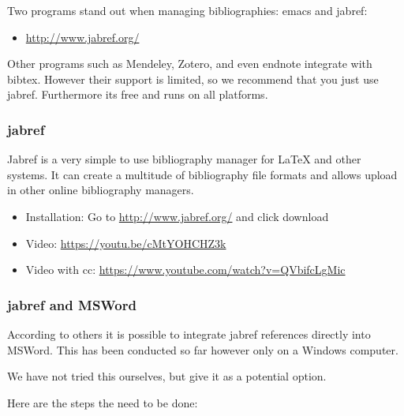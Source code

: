 Two programs stand out when managing bibliographies: emacs and jabref:

\begin{itemize}
\tightlist
\item
  \url{http://www.jabref.org/}
\end{itemize}

Other programs such as Mendeley, Zotero, and even endnote integrate with
bibtex. However their support is limited, so we recommend that you just
use jabref. Furthermore its free and runs on all platforms.

\subsubsection{jabref}\label{jabref}

Jabref is a very simple to use bibliography manager for LaTeX and other
systems. It can create a multitude of bibliography file formats and
allows upload in other online bibliography managers.

\begin{itemize}
\tightlist
\item
  Installation: Go to \url{http://www.jabref.org/} and click download
\item
  Video: \url{https://youtu.be/cMtYOHCHZ3k}
\item
  Video with cc: \url{https://www.youtube.com/watch?v=QVbifcLgMic}
\end{itemize}

\subsubsection{jabref and MSWord}\label{jabref-and-msword}

According to others it is possible to integrate jabref references
directly into MSWord. This has been conducted so far however only on a
Windows computer.

We have not tried this ourselves, but give it as a potential option.

Here are the steps the need to be done:

